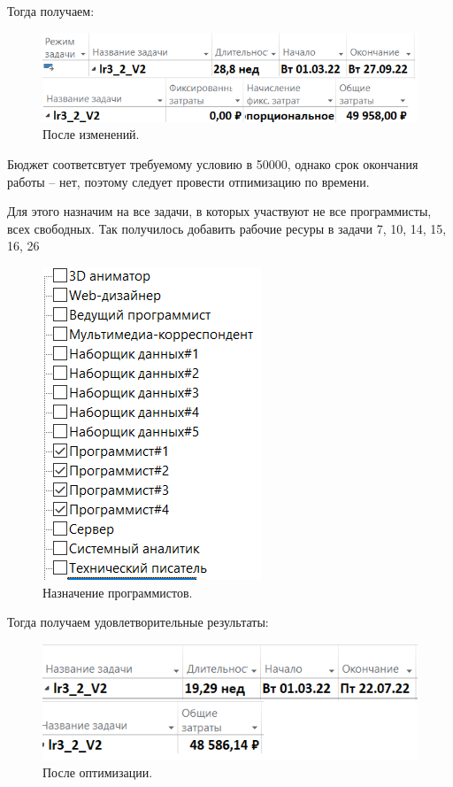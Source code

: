 \documentclass[a4paper,14pt]{extreport} %
\begin{document}
\begin{enumerate}
Тогда получаем:

\begin{figure}[H]
  \centering
  \caption{После изменений. }
  \includegraphics[scale=0.9]{11}
\end{figure}

Бюджет соответсвтует требуемому условию в 50000, однако срок окончания работы -- нет, поэтому следует провести отпимизацию по времени.

Для этого назначим на все задачи, в которых участвуют не все программисты, всех свободных. Так получилось добавить рабочие ресуры в задачи 7, 10, 14, 15, 16, 26

\begin{figure}[H]
	\centering
	\caption{Назначение программистов. }
	\includegraphics[scale=0.9]{8}
\end{figure}

Тогда получаем удовлетворительные результаты:

\begin{figure}[H]
	\centering
	\caption{После оптимизации. }
	\includegraphics[scale=0.9]{112}
\end{figure}


\end{enumerate}
\end{document}
